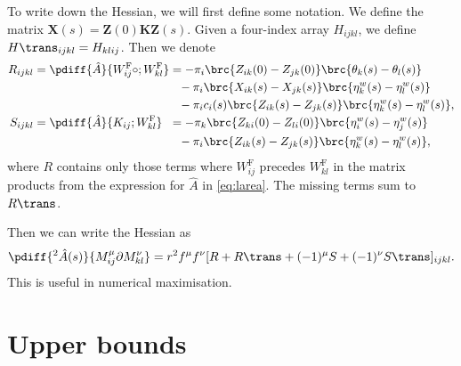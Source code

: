 \documentclass[12pt]{article}
\newcommand{\eqm}{\pi}
\newcommand{\fundm}{Z}
\newcommand{\fund}{\mathbf{\fundm}}
\newcommand{\etwm}{\eta^w}
\newcommand{\thbm}{\theta}
\newcommand{\Wm}{W}
\newcommand{\MMdm}{M}
\newcommand{\encm}{K}
\newcommand{\enc}{\mathbf{\encm}}
\newcommand{\frgm}{\Wm^{\mathrm{F}}}
\begin{document}
To write down the Hessian, we will first define some notation.
We define the matrix \(\mathbf{X}(s) = \fund(0) \enc \fund(s)\).
Given a four-index array \(H_{ijkl}\), we define \(H\trans_{ijkl} = H_{klij}\).
Then we denote
%
\begin{equation}\label{eq:hessparts}
\begin{alignedat}{2}
  R_{ijkl} &= \smash{\pdiff{\hat{A}}{\frgm_{ij} \circ ; \frgm_{kl}}} &
  &=
    - \eqm_i \brc{\fundm_{ik}(0) - \fundm_{jk}(0)} \brc{\thbm_k(s) - \thbm_l(s)} \\
  &&&\hphantom{=} {}
    - \eqm_i \brc{{X}_{ik}(s) - {X}_{jk}(s)} 
          \brc{\etwm_k(s) - \etwm_l(s)} \\
  &&& \hphantom{=} {}
    - \eqm_i {c}_i(s) \brc{\fundm_{ik}(s) - \fundm_{jk}(s)} 
          \brc{\etwm_k(s) - \etwm_l(s)},  \\
  S_{ijkl} &= \smash{\pdiff{\hat{A}}{\encm_{ij} ; \frgm_{kl}} } &
  &= 
    - \eqm_k \brc{\fundm_{ki}(0) - \fundm_{li}(0)} \brc{\etwm_i(s) - \etwm_j(s)} \\
  &&& \hphantom{=} {}
    - \eqm_i \brc{\fundm_{ik}(s) - \fundm_{jk}(s)} \brc{\etwm_k(s) - \etwm_l(s)},
\end{alignedat}
\end{equation}
%
where \(R\) contains only those terms where \( \frgm_{ij} \) precedes \( \frgm_{kl} \) in the matrix products from the expression for \( \hat{A} \) in \cref{eq:larea}.
The missing terms sum to \(R\trans\).

Then we can write the Hessian as
%
\begin{equation}\label{eq:hessian}
  \pdiff{^2\hat{A}(s)}{\MMdm^\mu_{ij} \partial \MMdm^\nu_{kl}} =
     r^2 f^\mu f^\nu [R + R\trans + (-1)^\mu S + (-1)^\nu S\trans]_{ijkl}.
\end{equation}
%
This is useful in numerical maximisation.


\section{Upper bounds}\label{sec:upperbnds}
\end{document}
